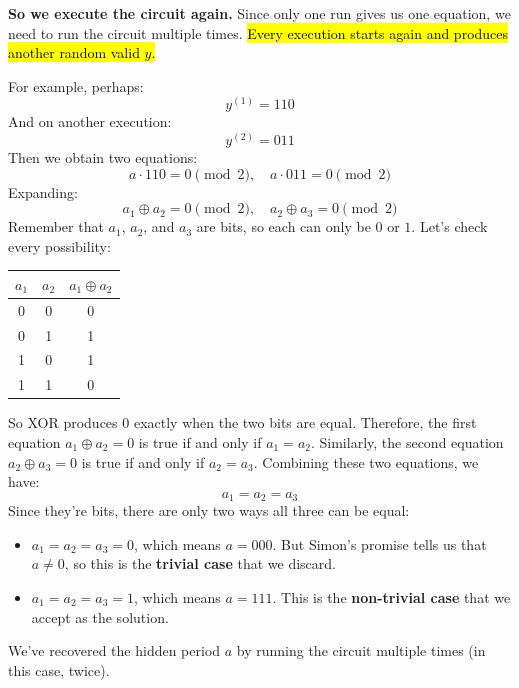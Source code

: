 \highspace
\textcolor{Green3}{ \textbf{So we execute the circuit again.}} Since only one run gives us one equation, we need to run the circuit multiple times. \hl{Every execution starts again and produces another random valid $y$.}

\highspace
For example, perhaps:
\begin{equation*}
    y^{(1)} = 110
\end{equation*}
And on another execution:
\begin{equation*}
    y^{(2)} = 011
\end{equation*}
Then we obtain two equations:
\begin{equation*}
    a \cdot 110 = 0 \pmod 2, \quad a \cdot 011 = 0 \pmod 2
\end{equation*}
Expanding:
\begin{equation*}
    a_1 \oplus a_2 = 0 \pmod 2, \quad a_2 \oplus a_3 = 0 \pmod 2
\end{equation*}
Remember that $a_1$, $a_2$, and $a_3$ are bits, so each can only be $0$ or $1$. Let's check every possibility:
\begin{center}
    \begin{tabular}{@{} c c c @{}}
        \toprule
        $a_1$ & $a_2$ & $a_1 \oplus a_2$ \\
        \midrule
        0 & 0 & 0 \\
        0 & 1 & 1 \\
        1 & 0 & 1 \\
        1 & 1 & 0 \\
        \bottomrule
    \end{tabular}
\end{center}
\noindent
So XOR produces $0$ exactly when the two bits are equal. Therefore, the first equation $a_1 \oplus a_2 = 0$ is true if and only if $a_1 = a_2$. Similarly, the second equation $a_2 \oplus a_3 = 0$ is true if and only if $a_2 = a_3$. Combining these two equations, we have:
\begin{equation*}
    a_1 = a_2 = a_3
\end{equation*}
Since they're bits, there are only two ways all three can be equal:
\begin{itemize}
    \item $a_1 = a_2 = a_3 = 0$, which means $a = 000$. But Simon's promise tells us that $a \neq 0$, so this is the \textbf{trivial case} that we discard.
    \item $a_1 = a_2 = a_3 = 1$, which means $a = 111$. This is the \textbf{non-trivial case} that we accept as the solution.
\end{itemize}
We've recovered the hidden period $a$ by running the circuit multiple times (in this case, twice).

